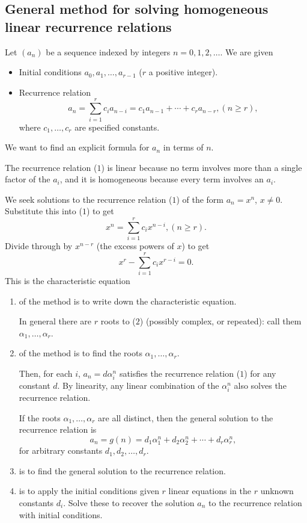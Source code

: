 \documentclass[10pt, a4paper]{article}
\begin{document}
\subsection{General method for solving homogeneous linear recurrence relations}
Let $(a_n)$ be a sequence indexed by integers $n = 0, 1, 2, \dotsc$.
We are given
\begin{itemize}
    \item Initial conditions $a_0, a_1, \dotsc, a_{r - 1}$ ($r$ a positive integer).
    \item Recurrence relation
    \begin{equation}
        a_n = \sum_{i = 1}^{r}c_ia_{n - i} = c_1a_{n - 1} + \dotsi + c_ra_{n - r}, (n \geq r),
    \end{equation}
    where $c_1, \dotsc, c_r$ are specified constants.
\end{itemize}

We want to find an explicit formula for $a_n$ in terms of $n$.

The recurrence relation ($1$) is linear because no term involves more than a single factor of the $a_i$,
and it is homogeneous because every term involves an $a_i$.

We seek solutions to the recurrence relation ($1$) of the form $a_n = x ^ n$, $x \neq 0$.
Substitute this into ($1$) to get
\[
x ^ n = \sum_{i = 1}^{r}c_i x ^ {n - i}, (n \geq r).
\]
Divide through by $x ^ {n - r}$
(the excess powers of $x$)
to get
\begin{equation}
    x ^ r - \sum_{i = 1}^{r}c_ix ^ {r - i} = 0.
\end{equation}
This is the characteristic equation
\begin{enumerate}[label = \textbf{Step \arabic*}]
    \item of the method is to write down the characteristic equation.
    
    In general there are $r$ roots to ($2$)
    (possibly complex, or repeated):
    call them $\alpha_1, \dotsc, \alpha_r$.
    \item of the method is to find the roots $\alpha_1, \dotsc, \alpha_r$.
    
    Then,
    for each $i$,
    $a_n = d\alpha_i ^ n$ satisfies the recurrence relation ($1$) for any constant $d$.
    By linearity,
    any linear combination of the $\alpha_i ^ n$ also solves the recurrence relation.

    If the roots $\alpha_1, \dotsc, \alpha_r$ are all distinct,
    then the general solution to the recurrence relation is
    \[
    a_n = g(n) = d_1\alpha_1 ^ n + d_2\alpha_2 ^ n + \dotsi + d_r\alpha_r ^ n,
    \]
    for arbitrary constants $d_1, d_2, \dotsc, d_r$.
    \item is to find the general solution to the recurrence relation.
    \item is to apply the initial conditions given $r$ linear equations in the $r$ unknown constants $d_i$.
    Solve these to recover the solution $a_n$ to the recurrence relation with initial conditions.
\end{enumerate}
\end{document}
